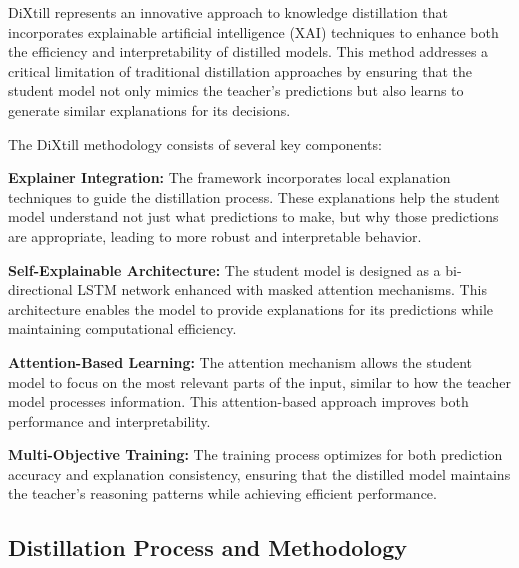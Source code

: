 DiXtill represents an innovative approach to knowledge distillation that incorporates explainable artificial intelligence (XAI) techniques to enhance both the efficiency and interpretability of distilled models. This method addresses a critical limitation of traditional distillation approaches by ensuring that the student model not only mimics the teacher's predictions but also learns to generate similar explanations for its decisions.


The DiXtill methodology consists of several key components:

\textbf{Explainer Integration:} The framework incorporates local explanation techniques to guide the distillation process. These explanations help the student model understand not just what predictions to make, but why those predictions are appropriate, leading to more robust and interpretable behavior.

\textbf{Self-Explainable Architecture:} The student model is designed as a bi-directional LSTM network enhanced with masked attention mechanisms. This architecture enables the model to provide explanations for its predictions while maintaining computational efficiency.


\textbf{Attention-Based Learning:} The attention mechanism allows the student model to focus on the most relevant parts of the input, similar to how the teacher model processes information. This attention-based approach improves both performance and interpretability.

\textbf{Multi-Objective Training:} The training process optimizes for both prediction accuracy and explanation consistency, ensuring that the distilled model maintains the teacher's reasoning patterns while achieving efficient performance.

\subsection{Distillation Process and Methodology}


